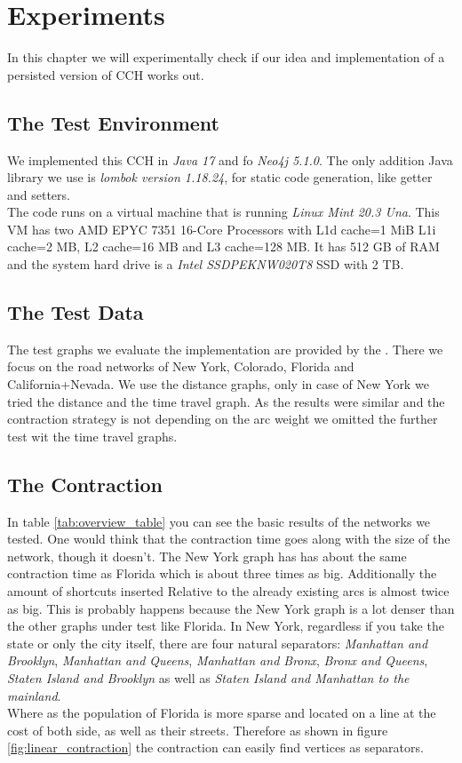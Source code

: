 \chapter{Experiments}

In this chapter we will experimentally check if our idea and implementation of a persisted version of CCH works out.

\section{The Test Environment}

We implemented this CCH in \textit{Java 17} and fo \textit{Neo4j 5.1.0}. The only addition Java library we use is \textit{lombok version 1.18.24}, for static code generation, like getter and setters.
\\
The code runs on a virtual machine that is running \textit{Linux Mint 20.3 Una}. This VM has two  AMD EPYC 7351 16-Core Processors with L1d cache=1 MiB L1i cache=2 MB, L2 cache=16 MB and L3 cache=128 MB. 
It has 512 GB of RAM and the system hard drive is a \textit{Intel SSDPEKNW020T8} SSD with 2 TB.


\section{The Test Data}

The test graphs we evaluate the implementation are provided by the \cite[9th DIMACS Implementation Challenge - Shortest Paths]{DIMACS}. There we focus on the road networks of New York, Colorado, Florida and California+Nevada.
We use the distance graphs, only in case of New York we tried the distance and the time travel graph. As the results were similar and the contraction strategy is not depending on the arc weight we omitted the further test wit the time travel graphs.

\section{The Contraction}

In table \ref{tab:overview_table} you can see the basic results of the networks we tested. One would think that the contraction time goes along with the size of the network, though it doesn't. The New York graph has has about the same contraction time 
as Florida which is about three times as big. Additionally the amount of shortcuts inserted Relative to the already existing arcs is almost twice as big. This is probably happens because the New York graph is a lot denser than the other graphs under test like Florida.
In New York, regardless if you take the state or only the city itself, there are four natural separators: \textit{Manhattan and Brooklyn}, \textit{Manhattan and Queens}, \textit{Manhattan and Bronx}, \textit{Bronx and Queens}, \textit{Staten Island and Brooklyn} as well as \textit{Staten Island and Manhattan to the mainland}.  
\\ 
Where as the population of Florida is more sparse and located on a line at the cost of both side, as well as their streets. Therefore as shown in figure \ref{fig:linear_contraction} the contraction can easily find vertices as separators. 

